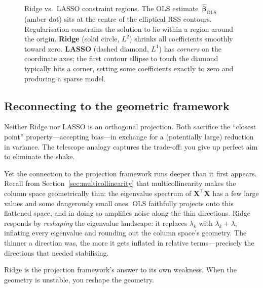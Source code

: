 \documentclass[11pt,a4paper]{article}
\theoremstyle{plain}
\theoremstyle{definition}
\newcommand{\bX}{\bm{X}}
\begin{document}
\begin{figure}[ht]
\caption{Ridge vs.\ LASSO constraint regions.  The OLS
estimate~$\hat{\bm{\beta}}_{\mathrm{OLS}}$ (amber dot) sits at the
centre of the elliptical RSS contours.  Regularisation constrains the
solution to lie within a region around the origin.  \textbf{Ridge}
(solid circle, $L^2$) shrinks all coefficients smoothly toward zero.
\textbf{LASSO} (dashed diamond, $L^1$) has \emph{corners} on the
coordinate axes; the first contour ellipse to touch the diamond
typically hits a corner, setting some coefficients exactly to zero
and producing a sparse model.}
\label{fig:ridge-lasso}
\end{figure}


\subsection{Reconnecting to the geometric framework}

Neither Ridge nor LASSO is an orthogonal projection.
Both sacrifice the ``closest point'' property---accepting bias---in
exchange for a (potentially large) reduction in variance.
The telescope analogy captures the trade-off:
you give up perfect aim to eliminate the shake.

Yet the connection to the projection framework runs deeper than it
first appears.
Recall from Section~\ref{sec:multicollinearity} that
multicollinearity makes the column space geometrically thin:
the eigenvalue spectrum of $\bX^\top\bX$ has a few large values
and some dangerously small ones.
OLS faithfully projects onto this flattened space, and in doing so
amplifies noise along the thin directions.
Ridge responds by \emph{reshaping} the eigenvalue landscape:
it replaces $\lambda_k$ with $\lambda_k + \lambda$, inflating every
eigenvalue and rounding out the column space's geometry.
The thinner a direction was, the more it gets inflated in relative
terms---precisely the directions that needed stabilising.

Ridge is the projection framework's answer to its own weakness.
When the geometry is unstable, you reshape the geometry.
\end{document}
